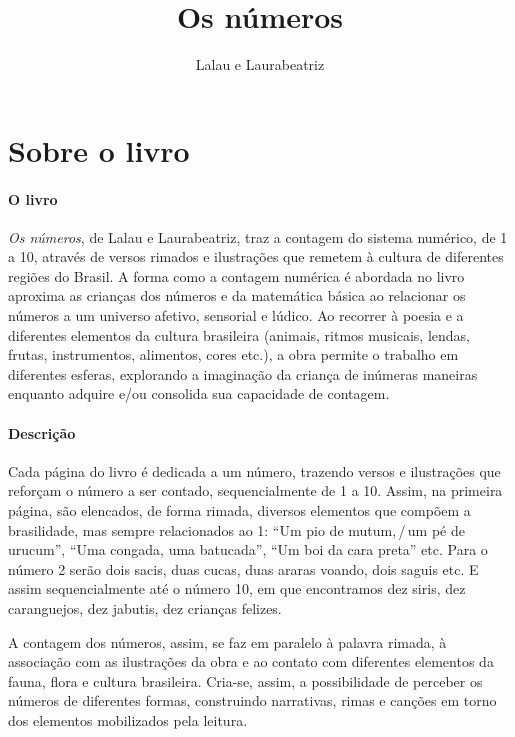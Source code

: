\documentclass[11pt]{extarticle}
\newcommand{\AutorLivro}{Lalau e Laurabeatriz}
\newcommand{\TituloLivro}{Os números}
\newcommand{\colaborador}{{Paulo Pompermaier e Renier Silva}}
\begin{document}
\title{\TituloLivro}
\author{\AutorLivro}
\def\authornotes{\colaborador}

\date{}
\maketitle


\tableofcontents



\section{Sobre o livro}

\paragraph{O livro} \textit{Os números}, de Lalau e Laurabeatriz, 
traz a contagem do sistema numérico, de 1 a 10, através de versos rimados e ilustrações que remetem à cultura de diferentes regiões do Brasil.
A forma como a contagem numérica é abordada no livro aproxima as crianças dos números e da matemática básica ao relacionar os números a um universo afetivo, sensorial e lúdico.
Ao recorrer à poesia e a diferentes elementos da cultura brasileira (animais, ritmos musicais, lendas, frutas, instrumentos, alimentos, cores etc.), a obra permite o trabalho em diferentes esferas, explorando a imaginação da criança de inúmeras maneiras enquanto adquire e/ou consolida sua capacidade de contagem.


\paragraph{Descrição} Cada página do livro é dedicada a um número, trazendo versos e ilustrações que reforçam o número a ser contado, sequencialmente de 1 a 10.
Assim, na primeira página, são elencados, de forma rimada, diversos elementos que compõem a brasilidade, mas sempre relacionados ao 1: ``Um pio de mutum,\,/\,um pé de urucum'', ``Uma congada, uma batucada'', ``Um boi da cara preta'' etc. Para o número 2 serão dois sacis, duas cucas, duas araras voando, dois saguis etc. E assim sequencialmente até o número 10, em que encontramos dez siris, dez caranguejos, dez jabutis, dez crianças felizes.

A contagem dos números, assim, se faz em paralelo à palavra rimada, à associação com as ilustrações da obra e ao contato com diferentes elementos da fauna, flora e cultura brasileira. Cria-se, assim, a possibilidade de perceber os números de diferentes formas, construindo narrativas, rimas e canções em torno dos elementos mobilizados pela leitura.
\end{document}
